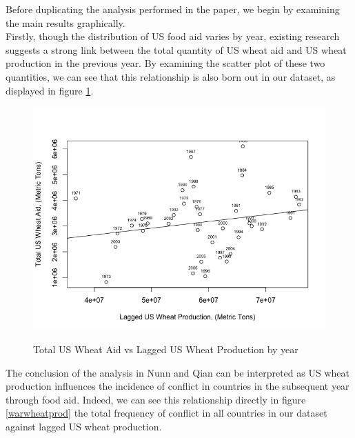 \documentclass{article}
\begin{document}
Before duplicating the analysis performed in the paper, we begin by examining the main results graphically. \\

Firstly, though the distribution of US food aid varies by year, existing research suggests a strong link between the total quantity of US wheat aid and US wheat production in the previous year. By examining the scatter plot of these two quantities, we can see that this relationship is also born out in our dataset, as displayed in figure \ref{wheataidprod}.\\


\begin{figure}
\centering
\includegraphics[scale=0.5]{wheatAidvsProd}
\label{wheataidprod}
\caption{Total US Wheat Aid vs Lagged US Wheat Production by year}
\end{figure}
 
The conclusion of the analysis in Nunn and Qian can be interpreted as US wheat production influences the incidence of conflict in countries in the subsequent year through food aid. Indeed, we can see this relationship directly in figure \ref{warwheatprod} the total frequency of conflict in all countries in our dataset against lagged US wheat production. 
\end{document}
